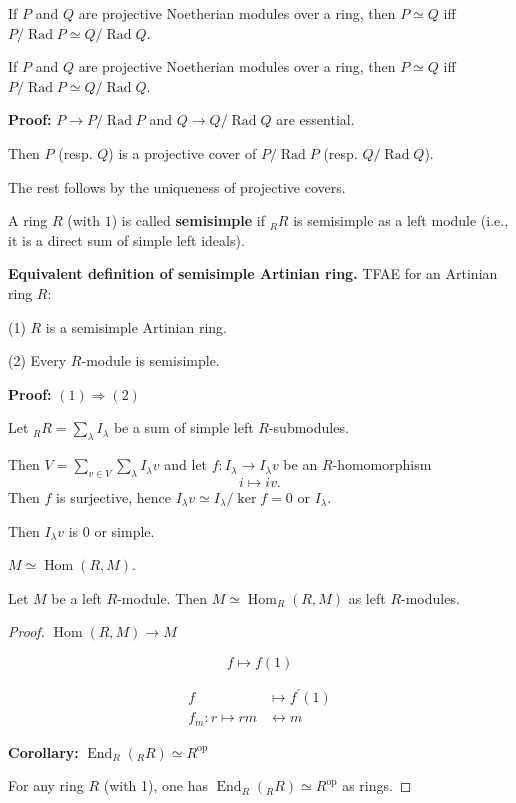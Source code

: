 \documentclass[11pt, a4paper]{report}
\begin{document}
\begin{corollary}
If $P$ and $Q$ are projective Noetherian modules over a ring, then $P \simeq Q$ iff $P/\operatorname{Rad}P \simeq Q/\operatorname{Rad}Q$.
\end{corollary}

\begin{corollary}
If $P$ and $Q$ are projective Noetherian modules over a ring, then $P \simeq Q$ iff $P/\operatorname{Rad}P \simeq Q/\operatorname{Rad}Q$.

\textbf{Proof:} $P \rightarrow P/\operatorname{Rad}P$ and $Q \rightarrow Q/\operatorname{Rad}Q$ are essential.

Then $P$ (resp. $Q$) is a projective cover of $P/\operatorname{Rad}P$ (resp. $Q/\operatorname{Rad}Q$).

The rest follows by the uniqueness of projective covers.
\end{corollary}

\begin{definition}
A ring $R$ (with $1$) is called \textbf{semisimple} if ${}_{R}R$ is semisimple as a left module (i.e., it is a direct sum of simple left ideals).
\end{definition}

\begin{theorem}
\textbf{Equivalent definition of semisimple Artinian ring.} TFAE for an Artinian ring $R$:

(1) $R$ is a semisimple Artinian ring.

(2) Every $R$-module is semisimple.

\textbf{Proof:} $(1) \Rightarrow (2)$

Let ${}_{R}R = \sum_{\lambda} I_{\lambda}$ be a sum of simple left $R$-submodules.

Then $V = \sum_{v \in V} \sum_{\lambda} I_{\lambda}v$ and let $f: I_{\lambda} \rightarrow I_{\lambda}v$ be an $R$-homomorphism
\[
i \mapsto iv.
\]
Then $f$ is surjective, hence $I_{\lambda}v \simeq I_{\lambda}/\ker f = 0$ or $I_{\lambda}$.

Then $I_{\lambda}v$ is $0$ or simple.
\end{theorem}

\begin{lemma}
$M \simeq \operatorname{Hom}(R, M)$.

Let $M$ be a left $R$-module. Then $M \simeq \operatorname{Hom}_{R}(R, M)$ as left $R$-modules.
\end{lemma}
\begin{proof}
$\operatorname{Hom}(R, M) \rightarrow M$

\[
f \mapsto f(1)
\]

\[
\begin{aligned}
f & \mapsto f^{\prime}(1) \\
f_{m}: r \mapsto r m & \longleftrightarrow m
\end{aligned}
\]

\textbf{Corollary:} $\operatorname{End}_{R}({}_{R}R) \simeq R^{\mathrm{op}}$

For any ring $R$ (with 1), one has $\operatorname{End}_{R}({}_{R}R) \simeq R^{\mathrm{op}}$ as rings.
\end{proof}
\end{document}
